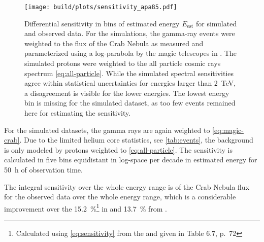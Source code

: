 \begin{figure}
  \centering
  \texttt{[image: build/plots/sensitivity\_apa85.pdf]}
  \caption{%
    Differential sensitivity in bins of estimated energy $E_\text{est}$ for
    simulated and observed data. 
    For the simulations, the gamma-ray events were weighted to the 
    flux of the Crab Nebula as measured and parameterized using a log-parabola 
    by the \gls{magic} telescopes in \cite{magic-crab}. 
    The simulated protons were weighted to the all particle cosmic rays spectrum
    \eqref{eq:all-particle}.
    While the simulated spectral sensitivities agree within statistical uncertainties
    for energies larger than \SI{2}{\TeV},
    a disagreement is visible for the lower energies.
    The lowest energy bin is missing for the simulated dataset,
    as too few events remained here for estimating the sensitivity.
  }\label{fig:sensitivity}
\end{figure}

For the simulated datasets, the gamma rays are again weighted to \eqref{eq:magic-crab}.
Due to the limited helium core statistics, see \autoref{tab:events}, the background
is only modeled by protons weighted to \eqref{eq:all-particle}.
The sensitivity is calculated in five bins equidistant in log-space per decade in estimated energy
for \SI{50}{\hour} of observation time.

The integral sensitivity over the whole energy range is \unskip{} of the Crab Nebula flux for the observed data over the whole energy range,
which is a considerable improvement over the \SI{15.2}{\percent}\footnote{Calculated
using \eqref{eq:sensitivity} from the \Non{} and \Noff{} given in Table 6.7, p.~72} in \cite{phd-temme}
and \SI{13.7}{\percent} from \cite{icrc-performance}.
